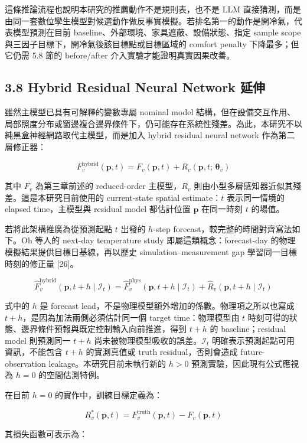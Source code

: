 \documentclass[12pt,a4paper]{article}
\begin{document}
這條推論流程也說明本研究的推薦動作不是規則表，也不是 LLM 直接猜測，而是由同一套數位孿生模型對候選動作做反事實模擬。若排名第一的動作是開冷氣，代表模型預測在目前 baseline、外部環境、家具遮蔽、設備狀態、指定 sample scope 與三因子目標下，開冷氣後該目標點或目標區域的 comfort penalty 下降最多；但它仍需 5.8 節的 before/after 介入實驗才能證明真實因果改善。


\subsection*{3.8 Hybrid Residual Neural Network 延伸}

雖然主模型已具有可解釋的變數專屬 nominal model 結構，但在設備交互作用、局部照度分布或窗邊複合邊界條件下，仍可能存在系統性殘差。為此，本研究不以純黑盒神經網路取代主模型，而是加入 hybrid residual neural network 作為第二層修正器：


\[
F_v^{\text{hybrid}}(\mathbf{p},t) = F_v(\mathbf{p},t) + R_v(\mathbf{p},t;\,\boldsymbol{\theta}_v)
\]

其中 $F_v$ 為第三章前述的 reduced-order 主模型，$R_v$ 則由小型多層感知器近似其殘差。這是本研究目前使用的 current-state spatial estimate：$t$ 表示同一情境的 elapsed time，主模型與 residual model 都估計位置 $\mathbf{p}$ 在同一時刻 $t$ 的場值。


若將此架構推廣為從預測起點 $t$ 出發的 $h$-step forecast，較完整的時間對齊寫法如下。Oh 等人的 next-day temperature study 即屬這類概念：forecast-day 的物理模擬結果提供目標日基線，再以歷史 simulation--measurement gap 學習同一目標時刻的修正量 [26]。


\[
\widehat{F}_v^{\text{hybrid}}(\mathbf{p},t+h\mid\mathcal{I}_t)=\widehat{F}_v^{\text{phys}}(\mathbf{p},t+h\mid\mathcal{I}_t)+\widehat{R}_v(\mathbf{p},t+h\mid\mathcal{I}_t)
\]

式中的 $h$ 是 forecast lead，不是物理模型額外增加的係數。物理項之所以也寫成 $t+h$，是因為加法兩側必須估計同一個 target time：物理模型由 $t$ 時刻可得的狀態、邊界條件預報與既定控制輸入向前推進，得到 $t+h$ 的 baseline；residual model 則預測同一 $t+h$ 尚未被物理模型吸收的誤差。$\mathcal{I}_t$ 明確表示預測起點可用資訊，不能包含 $t+h$ 的實測真值或 truth residual，否則會造成 future-observation leakage。本研究目前未執行新的 $h>0$ 預測實驗，因此現有公式應視為 $h=0$ 的空間估測特例。


在目前 $h=0$ 的實作中，訓練目標定義為：


\[
R_v^*(\mathbf{p},t) = F_v^{\text{truth}}(\mathbf{p},t) - F_v(\mathbf{p},t)
\]

其損失函數可表示為：
\end{document}
